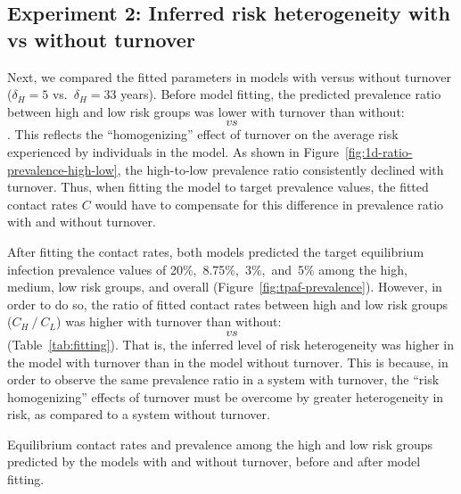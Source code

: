 \subsection{Experiment 2: Inferred risk heterogeneity with vs without turnover}
\label{ss:res-infer}
Next, we compared the fitted parameters in models with versus without turnover
($\delta_H = 5$ vs.\ $\delta_H = 33$ years).
Before model fitting, the predicted prevalence ratio
between high and low risk groups was lower with turnover than without:
$$~vs~%
$$.
This reflects the ``homogenizing'' effect of turnover on
the average risk experienced by individuals in the model.
As shown in Figure~\ref{fig:1d-ratio-prevalence-high-low},
the high-to-low prevalence ratio consistently declined with turnover.
Thus, when fitting the model to target prevalence values,
the fitted contact rates $C$ would have to compensate for
this difference in prevalence ratio with and without turnover.
\par
After fitting the contact rates, both models predicted
the target equilibrium infection prevalence values of 20\%,~8.75\%,~3\%,~and~5\%
among the high, medium, low risk groups, and overall
(Figure~\ref{fig:tpaf-prevalence}).
However, in order to do so, the ratio of fitted contact rates
between high and low risk groups ($C_H~/~C_L$)
was higher with turnover than without:
$$~vs~%
$$
(Table~\ref{tab:fitting}).
That is, the inferred level of risk heterogeneity was higher
in the model with turnover than in the model without turnover.
This is because,
in order to observe the same prevalence ratio in a system with turnover,
the ``risk homogenizing'' effects of turnover must be overcome by
greater heterogeneity in risk, as compared to a system without turnover.
\begin{table}
  \centering
  \caption{Equilibrium contact rates and prevalence
    among the high and low risk groups
    predicted by the models with and without turnover,
    before and after model fitting.}
  \label{tab:fitting}
  
\end{table}
